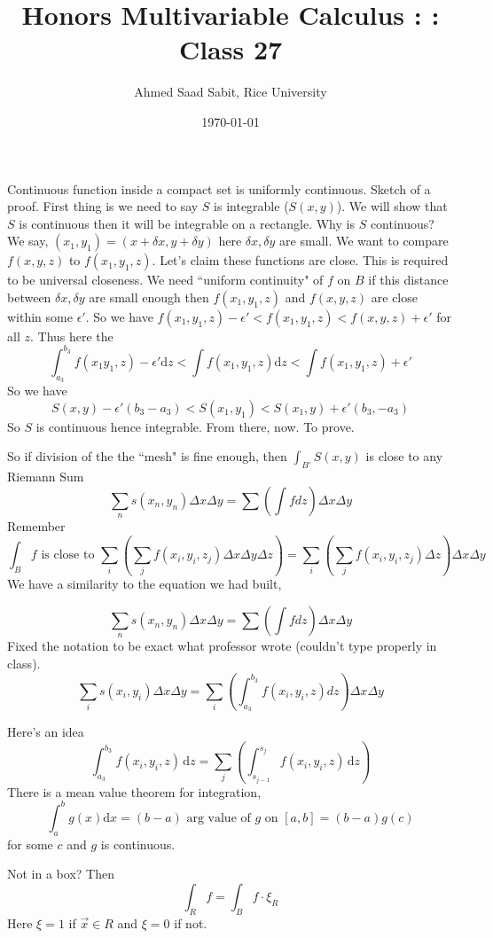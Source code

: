 \documentclass[letter]{article}
\title{Honors Multivariable Calculus : : Class 27}
\author{Ahmed Saad Sabit, Rice University}
\date{\today}
\begin{document}
\maketitle
	
Continuous function inside a compact set is uniformly continuous. 
Sketch of a proof. First thing is we need to say $S$ is integrable ($S(x,y)$). We will show that $S$ is continuous then it will be integrable on a rectangle. 
Why is $S$ continuous? We say, 
$(x_1, y_1) = (x + \delta x , y + \delta y)$ here $\delta x  , \delta y$ are small. We want to compare $f(x,y,z)$ to $f(x_1,y_1, z)$. Let's claim these functions are close. 
This is required to be universal closeness. We need ``uniform continuity" of $f$ on $B$ if this distance between $\delta x, \delta y$ are small enough then $f(x_1,y_1,z)$ and $f(x,y,z)$ are close within some $\epsilon'$. So we have $f(x_1, y_1, z) - \epsilon' < f(x_1,y_1,z) < f(x,y,z) + \epsilon'$ for all $z$. Thus here the 
\[
	\int_{a_3}^{b_3} f(x_1 y_1 , z) - \epsilon' \mathrm{d} z < 
	\int f(x_1, y_1 , z) \mathrm{d} z  
	< 
	\int f(x_1, y_1, z) + \epsilon ' 
\]
So we have 
\[
S(x,y) - \epsilon' (b_3 - a_3) < S(x_1,y_1) < S(x_1, y) + \epsilon'(b_3, -a_3)
\]
So $S$ is continuous hence integrable. From there, now. To prove. 

So if division of the the ``mesh" is fine enough, then $\int_{B'} S(x,y)$ is close to any Riemann Sum 
\[
\sum_{n}^{} s(x_n , y_n ) \Delta x \Delta y = 
\sum_{}^{} 
\left(\int f dz\right) \Delta x \Delta y
\]
Remember
\[
\int_B f  \text{ is close to } \sum_{i}^{} \left(
\sum_{j}^{} f(x_i , y _i , z_j) \Delta x \Delta y \Delta z
\right) 
= 
\sum_{i}^{} \left(
\sum_{j} f(x_i, y_i, z_j) \Delta z
\right) \Delta x \Delta y
\]
We have a similarity to the equation we had built, 

\[
\sum_{n}^{} s(x_n , y_n ) \Delta x \Delta y = 
\sum_{}^{} 
\left(\int f dz\right) \Delta x \Delta y
\]
Fixed the notation to be exact what professor wrote (couldn't type properly in class).
\[
\sum_{i}^{} s(x_i , y_i ) \Delta x \Delta y = 
\sum_{i}^{} 
\left(\int_{a_3}^{b_3} f(x_i, y_i, z) dz\right) \Delta x \Delta y
\]

Here's an idea
\[
	\int_{a_3}^{b_3} f(x_i, y_i, z) \, \mathrm{d} z = 
	\sum_{j}^{} 
	\left(
		\int_{s_{j-1}}^{s_j} f(x_i, y_i, z)\, \mathrm{d} z
	\right)
\]
There is a mean value theorem for integration, 
\[
	\int_a^b g(x) \mathrm{d}  x = (b-a) \text{ arg value of } g  \text{ on } [a,b] = (b-a) g(c) 
\] for some $c$ and $g$ is continuous. 

Not in a box? Then 
\[
\int_R f = \int_B f \cdot \xi_R
\]
Here $\xi = 1$ if $ \vec{x} \in  R$ and $\xi = 0$ if not.
\end{document}
